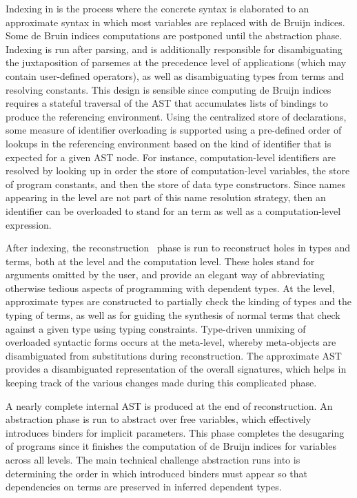 Indexing in \Beluga is the process where the concrete syntax is elaborated to an approximate syntax in which most variables are replaced with de Bruijn indices.
Some de Bruin indices computations are postponed until the abstraction phase.
Indexing is run after parsing, and is additionally responsible for disambiguating the juxtaposition of \LF parsemes at the precedence level of applications (which may contain user-defined operators), as well as disambiguating \LF types from terms and resolving constants.
This design is sensible since computing de Bruijn indices requires a stateful traversal of the \ac{AST} that accumulates lists of bindings to produce the referencing environment.
Using the centralized store of declarations, some measure of identifier overloading is supported using a pre-defined order of lookups in the referencing environment based on the kind of identifier that is expected for a given \ac{AST} node.
For instance, computation-level identifiers are resolved by looking up in order the store of computation-level variables, the store of program constants, and then the store of data type constructors.
Since names appearing in the \LF level are not part of this name resolution strategy, then an identifier can be overloaded to stand for an \LF term as well as a computation-level expression.

After indexing, the reconstruction~\cite{pientka2013insider} phase is run to reconstruct holes in types and terms, both at the \LF level and the computation level.
These holes stand for arguments omitted by the user, and provide an elegant way of abbreviating otherwise tedious aspects of programming with dependent types.
At the \LF level, approximate types are constructed to partially check the kinding of \LF types and the typing of \LF terms, as well as for guiding the synthesis of normal terms that check against a given type using typing constraints.
Type-driven unmixing of overloaded syntactic forms occurs at the meta-level, whereby meta-objects are disambiguated from substitutions during reconstruction.
The approximate \ac{AST} provides a disambiguated representation of the overall \Beluga signatures, which helps in keeping track of the various changes made during this complicated phase.

A nearly complete internal \ac{AST} is produced at the end of reconstruction.
An abstraction phase is run to abstract over free variables, which effectively introduces binders for implicit parameters.
This phase completes the desugaring of \Beluga programs since it finishes the computation of de Bruijn indices for variables across all levels.
The main technical challenge abstraction runs into is determining the order in which introduced binders must appear so that dependencies on terms are preserved in inferred dependent types.

